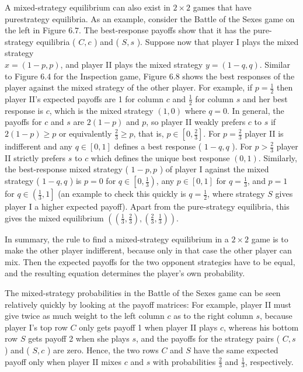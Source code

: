 \documentclass[12pt]{article}
\begin{document}
A mixed-strategy equilibrium can also exist in $2 \times 2$ games that have purestrategy equilibria. As an example, consider the Battle of the Sexes game on the left in Figure 6.7. The best-response payoffs show that it has the pure-strategy equilibria ( $C, c$ ) and ( $S, s$ ). Suppose now that player I plays the mixed strategy\\
$x=(1-p, p)$, and player II plays the mixed strategy $y=(1-q, q)$. Similar to Figure 6.4 for the Inspection game, Figure 6.8 shows the best responses of the player against the mixed strategy of the other player. For example, if $p=\frac{1}{2}$ then player II's expected payoffs are 1 for column $c$ and $\frac{1}{2}$ for column $s$ and her best response is $c$, which is the mixed strategy $(1,0)$ where $q=0$. In general, the payoffs for $c$ and $s$ are $2(1-p)$ and $p$, so player II weakly prefers $c$ to $s$ if $2(1-p) \geq p$ or equivalently $\frac{2}{3} \geq p$, that is, $p \in\left[0, \frac{2}{3}\right]$. For $p=\frac{2}{3}$ player II is indifferent and any $q \in[0,1]$ defines a best response ( $1-q, q$ ). For $p>\frac{2}{3}$ player II strictly prefers $s$ to $c$ which defines the unique best response $(0,1)$. Similarly, the best-response mixed strategy ( $1-p, p$ ) of player I against the mixed strategy ( $1-q, q$ ) is $p=0$ for $q \in\left[0, \frac{1}{3}\right)$, any $p \in[0,1]$ for $q=\frac{1}{3}$, and $p=1$ for $q \in\left(\frac{1}{3}, 1\right]$ (an example to check this quickly is $q=\frac{1}{2}$, where strategy $S$ gives player I a higher expected payoff). Apart from the pure-strategy equilibria, this gives the mixed equilibrium $\left(\left(\frac{1}{3}, \frac{2}{3}\right),\left(\frac{2}{3}, \frac{1}{3}\right)\right)$.

In summary, the rule to find a mixed-strategy equilibrium in a $2 \times 2$ game is to make the other player indifferent, because only in that case the other player can mix. Then the expected payoffs for the two opponent strategies have to be equal, and the resulting equation determines the player's own probability.

The mixed-strategy probabilities in the Battle of the Sexes game can be seen relatively quickly by looking at the payoff matrices: For example, player II must give twice as much weight to the left column $c$ as to the right column $s$, because player I's top row $C$ only gets payoff 1 when player II plays $c$, whereas his bottom row $S$ gets payoff 2 when she plays $s$, and the payoffs for the strategy pairs ( $C, s$ ) and ( $S, c$ ) are zero. Hence, the two rows $C$ and $S$ have the same expected payoff only when player II mixes $c$ and $s$ with probabilities $\frac{2}{3}$ and $\frac{1}{3}$, respectively.
\end{document}
